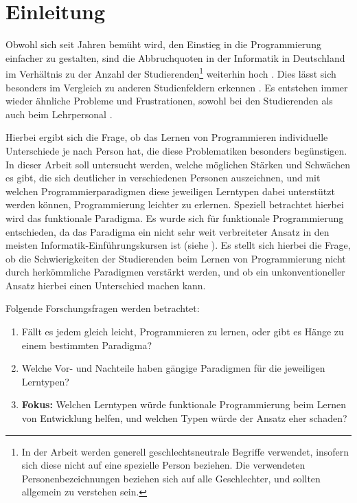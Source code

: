 \clearpage
\section{Einleitung}
\label{sec:intro}

Obwohl sich seit Jahren bemüht wird, den Einstieg in die Programmierung einfacher zu gestalten, sind die Abbruchquoten in der Informatik in Deutschland im Verhältnis zu der Anzahl der Studierenden\footnote{In der Arbeit werden generell geschlechtsneutrale Begriffe verwendet, insofern sich diese nicht auf eine spezielle Person beziehen. Die verwendeten Personenbezeichnungen beziehen sich auf alle Geschlechter, und sollten allgemein zu verstehen sein.} weiterhin hoch \cite{destatis}. Dies lässt sich besonders im Vergleich zu anderen Studienfeldern erkennen \cite{dhzw}.
Es entstehen immer wieder ähnliche Probleme und Frustrationen, sowohl bei den Studierenden als auch beim Lehrpersonal \cite{mcdonald}.

Hierbei ergibt sich die Frage, ob das Lernen von Programmieren individuelle Unterschiede je nach Person hat, die diese Problematiken besonders begünstigen. In dieser Arbeit soll untersucht werden, welche möglichen Stärken und Schwächen es gibt, die sich deutlicher in verschiedenen Personen auszeichnen, und mit welchen Programmierparadigmen diese jeweiligen Lerntypen dabei unterstützt werden können, Programmierung leichter zu erlernen.
Speziell betrachtet hierbei wird das funktionale Paradigma. Es wurde sich für funktionale Programmierung entschieden, da das Paradigma ein nicht sehr weit verbreiteter Ansatz in den meisten Informatik-Einführungskursen ist (siehe ). Es stellt sich hierbei die Frage, ob die Schwierigkeiten der Studierenden beim Lernen von Programmierung nicht durch herkömmliche Paradigmen verstärkt werden, und ob ein unkonventioneller Ansatz hierbei einen Unterschied machen kann.

Folgende Forschungsfragen werden betrachtet:

\begin{enumerate}
    \item Fällt es jedem gleich leicht, Programmieren zu lernen, oder gibt es Hänge zu einem bestimmten Paradigma?
    \item Welche Vor- und Nachteile haben gängige Paradigmen für die jeweiligen Lerntypen?
    \item \textbf{Fokus:} Welchen Lerntypen würde funktionale Programmierung beim Lernen von Entwicklung helfen, und welchen Typen würde der Ansatz eher schaden?
\end{enumerate}
